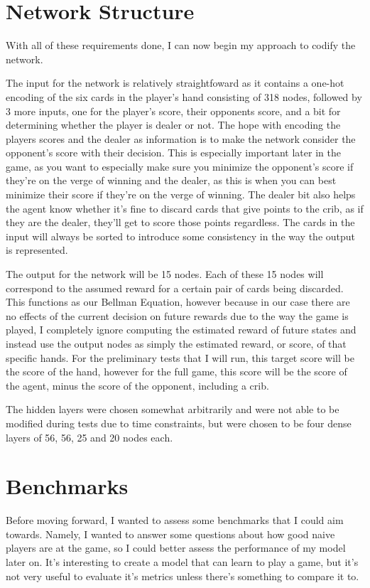 \documentclass[]{article}
\begin{document}
\section{Network Structure}

With all of these requirements done, I can now begin my approach to codify the network. 

The input for the network is relatively straightfoward as it contains a one-hot encoding of the six cards in the player's hand consisting of 318 nodes, followed by 3 more inputs, one for the player's score, their opponents score, and a bit for determining whether the player is dealer or not. The hope with encoding the players scores and the dealer as information is to make the network consider the opponent's score with their decision. This is especially important later in the game, as you want to especially make sure you minimize the opponent's score if they're on the verge of winning and the dealer, as this is when you can best minimize their score if they're on the verge of winning. The dealer bit also helps the agent know whether it's fine to discard cards that give points to the crib, as if they are the dealer, they'll get to score those points regardless. The cards in the input will always be sorted to introduce some consistency in the way the output is represented. 

The output for the network will be 15 nodes. Each of these 15 nodes will correspond to the assumed reward for a certain pair of cards being discarded. This functions as our Bellman Equation, however because in our case there are no effects of the current decision on future rewards due to the way the game is played, I completely ignore computing the estimated reward of future states and instead use the output nodes as simply the estimated reward, or score, of that specific hands. For the preliminary tests that I will run, this target score will be the score of the hand, however for the full game, this score will be the score of the agent, minus the score of the opponent, including a crib.

The hidden layers were chosen somewhat arbitrarily and were not able to be modified during tests due to time constraints, but were chosen to be four dense layers of 56, 56, 25 and 20 nodes each. 

\section{Benchmarks}

Before moving forward, I wanted to assess some benchmarks that I could aim towards. Namely, I wanted to answer some questions about how good naive players are at the game, so I could better assess the performance of my model later on. It's interesting to create a model that can learn to play a game, but it's not very useful to evaluate it's metrics unless there's something to compare it to. 
\end{document}
